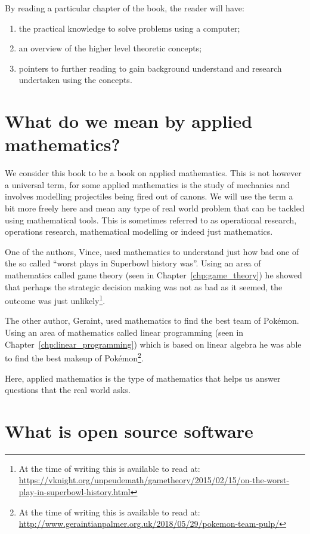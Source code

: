 By reading a particular chapter of the book, the reader will have:

\begin{enumerate}
  \item the practical knowledge to solve problems using a computer;
  \item an overview of the higher level theoretic concepts;
  \item pointers to further reading to gain background understand and research
        undertaken using the concepts.
\end{enumerate}

\section{What do we mean by applied mathematics?}\label{sec:what-do-we-mean-by-applied-mathematics}

We consider this book to be a book on applied mathematics. This is not
however a universal term, for some applied mathematics is the study of
mechanics and involves modelling projectiles being fired out of canons.
We will use the term a bit more freely here and mean any type of real
world problem that can be tackled using mathematical tools. This is
sometimes referred to as operational research, operations research,
mathematical modelling or indeed just mathematics.

One of the authors, Vince, used mathematics to understand just how bad one of
the so called ``worst plays in Superbowl history was''. Using an area of
mathematics called game theory (seen in Chapter~\ref{chp:game_theory}) he showed
that perhaps the strategic decision making was not as bad as it seemed, the
outcome was just unlikely\footnote{At the time of writing this is available to
read at:
\url{https://vknight.org/unpeudemath/gametheory/2015/02/15/on-the-worst-play-in-superbowl-history.html}}.

The other author, Geraint, used mathematics to find the best team of
Pokémon. Using an area of mathematics called linear programming (seen in
Chapter~\ref{chp:linear_programming}) which is
based on linear algebra he was able to find the best makeup of Pokémon\footnote{At the time of writing this is available to
read at:
\url{http://www.geraintianpalmer.org.uk/2018/05/29/pokemon-team-pulp/}}.

Here, applied mathematics is the type of mathematics that helps us
answer questions that the real world asks.

\section{What is open source software}
\label{sec:what-is-open-source-software}


